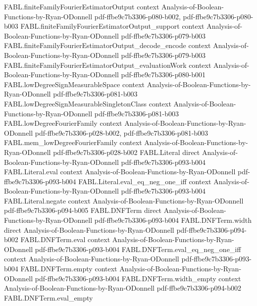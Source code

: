 \begin{theorem}
\proofstep
  {FABL.finiteFamilyFourierEstimatorOutput}
  {context}
  {Analysis-of-Boolean-Functions-by-Ryan-ODonnell}
  {pdf-ffbe9c7b3306-p080-b002,
    pdf-ffbe9c7b3306-p080-b003}
\proofstep
  {FABL.finiteFamilyFourierEstimatorOutput_support}
  {context}
  {Analysis-of-Boolean-Functions-by-Ryan-ODonnell}
  {pdf-ffbe9c7b3306-p079-b003}
\proofstep
  {FABL.finiteFamilyFourierEstimatorOutput_decode_encode}
  {context}
  {Analysis-of-Boolean-Functions-by-Ryan-ODonnell}
  {pdf-ffbe9c7b3306-p079-b003}
\proofstep
  {FABL.finiteFamilyFourierEstimatorOutput_evaluationWork}
  {context}
  {Analysis-of-Boolean-Functions-by-Ryan-ODonnell}
  {pdf-ffbe9c7b3306-p080-b001}
\proofstep
  {FABL.lowDegreeSignMeasurableSpace}
  {context}
  {Analysis-of-Boolean-Functions-by-Ryan-ODonnell}
  {pdf-ffbe9c7b3306-p081-b003}
\proofstep
  {FABL.lowDegreeSignMeasurableSingletonClass}
  {context}
  {Analysis-of-Boolean-Functions-by-Ryan-ODonnell}
  {pdf-ffbe9c7b3306-p081-b003}
\proofstep
  {FABL.lowDegreeFourierFamily}
  {context}
  {Analysis-of-Boolean-Functions-by-Ryan-ODonnell}
  {pdf-ffbe9c7b3306-p028-b002,
    pdf-ffbe9c7b3306-p081-b003}
\proofstep
  {FABL.mem_lowDegreeFourierFamily}
  {context}
  {Analysis-of-Boolean-Functions-by-Ryan-ODonnell}
  {pdf-ffbe9c7b3306-p028-b002}
\proofstep
  {FABL.Literal}
  {direct}
  {Analysis-of-Boolean-Functions-by-Ryan-ODonnell}
  {pdf-ffbe9c7b3306-p093-b004}
\proofstep
  {FABL.Literal.eval}
  {context}
  {Analysis-of-Boolean-Functions-by-Ryan-ODonnell}
  {pdf-ffbe9c7b3306-p093-b004}
\proofstep
  {FABL.Literal.eval_eq_neg_one_iff}
  {context}
  {Analysis-of-Boolean-Functions-by-Ryan-ODonnell}
  {pdf-ffbe9c7b3306-p093-b004}
\proofstep
  {FABL.Literal.negate}
  {context}
  {Analysis-of-Boolean-Functions-by-Ryan-ODonnell}
  {pdf-ffbe9c7b3306-p094-b005}
\proofstep
  {FABL.DNFTerm}
  {direct}
  {Analysis-of-Boolean-Functions-by-Ryan-ODonnell}
  {pdf-ffbe9c7b3306-p093-b004}
\proofstep
  {FABL.DNFTerm.width}
  {direct}
  {Analysis-of-Boolean-Functions-by-Ryan-ODonnell}
  {pdf-ffbe9c7b3306-p094-b002}
\proofstep
  {FABL.DNFTerm.eval}
  {context}
  {Analysis-of-Boolean-Functions-by-Ryan-ODonnell}
  {pdf-ffbe9c7b3306-p093-b004}
\proofstep
  {FABL.DNFTerm.eval_eq_neg_one_iff}
  {context}
  {Analysis-of-Boolean-Functions-by-Ryan-ODonnell}
  {pdf-ffbe9c7b3306-p093-b004}
\proofstep
  {FABL.DNFTerm.empty}
  {context}
  {Analysis-of-Boolean-Functions-by-Ryan-ODonnell}
  {pdf-ffbe9c7b3306-p093-b004}
\proofstep
  {FABL.DNFTerm.width_empty}
  {context}
  {Analysis-of-Boolean-Functions-by-Ryan-ODonnell}
  {pdf-ffbe9c7b3306-p094-b002}
\proofstep
  {FABL.DNFTerm.eval_empty}

\end{theorem}
